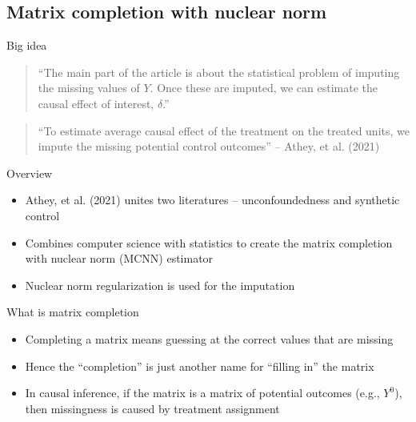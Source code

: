 \documentclass{beamer}
\begin{document}
\subsection{Matrix completion with nuclear norm}

\begin{frame}{Big idea}

\begin{quote}
``The main part of the article is about the statistical problem of imputing the missing values of $Y$.  Once these are imputed, we can estimate the causal effect of interest, $\delta$.''
\end{quote}

\bigskip

\begin{quote}
``To estimate average causal effect of the treatment on the treated units, we impute the missing potential control outcomes'' -- Athey, et al. (2021)
\end{quote}


\end{frame}

\begin{frame}{Overview}

\begin{itemize}
\item Athey, et al. (2021) unites two literatures -- unconfoundedness and synthetic control
\item Combines computer science with statistics to create the matrix completion with nuclear norm (MCNN) estimator
\item Nuclear norm regularization is used for the imputation
\end{itemize}

\end{frame}

\begin{frame}{What is matrix completion}

\begin{itemize}
\item Completing a matrix means guessing at the correct values that are missing 
\item Hence the ``completion'' is just another name for ``filling in'' the matrix 
\item In causal inference, if the matrix is a matrix of potential outcomes (e.g., $Y^0$), then missingness is caused by treatment assignment
\end{itemize}
\end{frame}
\end{document}
